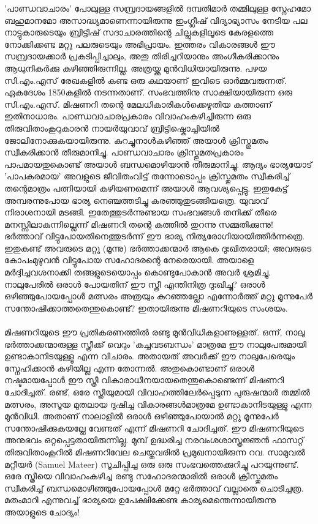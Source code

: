 'പാണ്ഡവാചാരം' പോലുള്ള സമ്പ്രദായങ്ങളിൽ ദമ്പതിമാർ തമ്മിലുള്ള സ്നേഹമോ ബഹുമാനമോ അസാദ്ധ്യമാണെന്നായിരുന്നു ഇംഗ്ലീഷ് വിദ്യാഭ്യാസം നേടിയ പല നാട്ടുകാരുടെയും ബ്രിട്ടിഷ് സദാചാരത്തിന്റെ ചില്ലുകളിലൂടെ കേരളത്തെ നോക്കിക്കണ്ട മറ്റു പലരുടെയും അഭിപ്രായം. ഇത്തരം വികാരങ്ങൾ ഈ സമ്പ്രദായക്കാർ പ്രകടിപ്പിച്ചാലും, അതു തിരിച്ചറിയാനും അംഗീകരിക്കാനും ആധുനികർക്കു കഴിഞ്ഞിരുന്നില്ല. അത്രയ്ക്കു മുൻവിധിയായിരുന്നു. പഴയ സി.എം.എസ് രേഖകളിൽ കണ്ട ഒരു കഥയാണ് ഇവിടെ ഓർമ്മവരുന്നത്. ഏകദേശം 1850കളിൽ നടന്നതാണ്. സംഭവത്തിനു സാക്ഷിയായിരുന്ന ഒരു സി.എം.എസ്. മിഷണറി തന്റെ മേലധികാരികൾക്കെഴുതിയ കത്താണ് ഇതിനാധാരം. പാണ്ഡവാചാരപ്രകാരം വിവാഹംകഴിച്ചിരുന്ന ഒരു തിരുവിതാംകൂറുകാരൻ നായർയുവാവ് ബ്രിട്ടിഷ്കൊച്ചിയിൽ ജോലിനോക്കുകയായിരുന്നു. കുറച്ചുനാൾകഴിഞ്ഞ് അയാൾ ക്രിസ്തുമതം സ്വീകരിക്കാൻ തീരുമാനിച്ചു. പാണ്ഡവാചാരം ക്രിസ്തുമതപ്രകാരം പാപമായതുകൊണ്ട് അയാൾ ബന്ധമൊഴിയാൻ തീരുമാനിച്ചു. ആദ്യം ഭാര്യയോട് 'പാപകരമായ' അവളുടെ ജീവിതംവിട്ട് തന്നോടൊപ്പം ക്രിസ്തുമതം സ്വീകരിച്ച് തന്റെമാത്രം പത്നിയായി കഴിയണമെന്ന് അയാൾ ആവശ്യപ്പെട്ടു. ഇതുകേട്ട് അമ്പരന്നുപോയ ഭാര്യ നെഞ്ചത്തടിച്ചു കരഞ്ഞുതുടങ്ങിയത്രെ. യുവാവ് നിരാശനായി മടങ്ങി. ഇതേത്തുടർന്നുണ്ടായ സംഭവങ്ങൾ തനിക്ക് തീരെ മനസ്സിലാകുന്നില്ലെന്ന് മിഷണറി തന്റെ കത്തിൽ തുറന്നു സമ്മതിക്കുന്നു! ഭർത്താവ് വിട്ടുപോയതിനെത്തുടർന്ന് ഈ ഭാര്യ നിത്യരോഗിയായിത്തീർന്നത്രെ. ഇതുകണ്ട് അവരുടെ മറ്റു (മൂന്നു) ഭർത്താക്കന്മാർ ആകെ ദുഃഖിതരായി; അവരുടെ കോപംമുഴുവൻ വിട്ടുപോയ സഹോദരന്റെ നേരെയായി. അയാളെ മർദ്ദിച്ചവശനാക്കി തങ്ങളുടെയൊപ്പം കൊണ്ടുപോകാൻ അവർ ശ്രമിച്ചു. നാലുപേരിൽ ഒരാൾ പോയതിന് ഈ സ്ത്രീ എന്തിനിത്ര ദുഃഖിച്ചു? ഒരാൾ ഒഴിഞ്ഞുപോയപ്പോൾ മത്സരം അത്രയും കുറഞ്ഞല്ലോ എന്നോർത്ത് മറ്റു മൂന്നുപേർ സന്തോഷിക്കാത്തതെന്തുകൊണ്ട്? ഇതായിരുന്നു മിഷണറിയുടെ സംശയം.

\paragraph{}മിഷണറിയുടെ ഈ പ്രതികരണത്തിൽ രണ്ടു മുൻവിധികളാണുള്ളത്. ഒന്ന്, നാലു ഭർത്താക്കന്മാരുള്ള സ്ത്രീക്ക് വെറും 'കച്ചവടബന്ധം' മാത്രമേ ഈ നാലുപേരുമായി ഉണ്ടാകാനിടയുള്ളൂ എന്ന വിചാരം. അതായത് അവർക്ക് ഈ നാലുപേരെയും സ്നേഹിക്കാൻ കഴിയില്ല എന്ന തോന്നൽ. അതുകൊണ്ടാണ് ഒരാൾ നഷ്ടമായപ്പോൾ ഈ സ്ത്രീ വികാരാധീനയായതെന്തുകൊണ്ടെന്ന് മിഷണറി ചോദിച്ചത്. രണ്ട്, ഒരേ സ്ത്രീയുമായി വിവാഹത്തിലേർപ്പെടുന്ന പുരുഷന്മാർ തമ്മിൽ മത്സരം, അസൂയ മുതലായ ദുഷിച്ച വികാരങ്ങൾമാത്രമേ ഉണ്ടാകാനിടയുള്ളു എന്ന മുൻവിധി. അതാണ് നാലാളിൽ ഒരാൾ ഒഴിഞ്ഞുപോയാൽ മറ്റു മൂന്നുപേർ സന്തോഷിക്കുകയല്ലേ വേണ്ടത് എന്ന് മിഷണറി ചോദിച്ചത്. ഈ മിഷണറിയുടെ അനുഭവം ഒറ്റപ്പെട്ടതായിരുന്നില്ല. മുമ്പ് ഉദ്ധരിച്ച നരവംശശാസ്ത്രജ്ഞൻ ഫാസറ്റ് തിരുവിതാംകൂറിൽ മിഷണറിവേല ചെയ്തവരിൽ പ്രമുഖനായിരുന്ന റവ. സാമുവൽ മറ്റീയർ (Samuel Mateer) സൂചിപ്പിച്ച ഒരു  ഒരു സംഭവത്തെക്കുറിച്ചു പറയുന്നുണ്ട്. ഒരേ സ്ത്രീയെ വിവാഹംകഴിച്ച രണ്ടു സഹോദരന്മാരിൽ ഒരാൾ ക്രിസ്തുമതം സ്വീകരിച്ച് ബന്ധമൊഴിഞ്ഞുപോയപ്പോൾ മറ്റേ ഭർത്താവ് വല്ലാതെ ചൊടിച്ചത്ര. മതംമാറി എന്നുവച്ച് ഭാര്യയെ ഉപേക്ഷിക്കേണ്ട കാര്യമെന്തെന്നായിരുന്നു അയാളുടെ ചോദ്യം!

